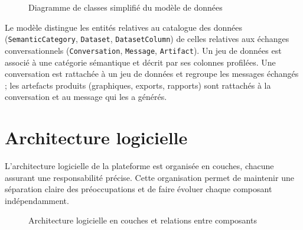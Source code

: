\begin{figure}[H]
\caption{Diagramme de classes simplifié du modèle de données}
\label{fig:classes-domaine}
\end{figure}

Le modèle distingue les entités relatives au catalogue des données (\texttt{SemanticCategory}, \texttt{Dataset}, \texttt{DatasetColumn}) de celles relatives aux échanges conversationnels (\texttt{Conversation}, \texttt{Message}, \texttt{Artifact}). Un jeu de données est associé à une catégorie sémantique et décrit par ses colonnes profilées. Une conversation est rattachée à un jeu de données et regroupe les messages échangés ; les artefacts produits (graphiques, exports, rapports) sont rattachés à la conversation et au message qui les a générés.

\section{Architecture logicielle}

L'architecture logicielle de la plateforme est organisée en couches, chacune assurant une responsabilité précise. Cette organisation permet de maintenir une séparation claire des préoccupations et de faire évoluer chaque composant indépendamment.

\begin{figure}[H]
\centering
{}
\caption{Architecture logicielle en couches et relations entre composants}
\label{fig:arch-couches}
\end{figure}

